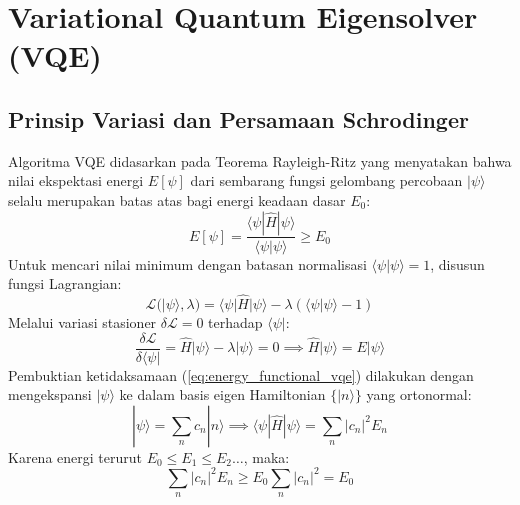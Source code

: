 \section{Variational Quantum Eigensolver (VQE)}

\subsection{Prinsip Variasi dan Persamaan Schrodinger}
Algoritma VQE didasarkan pada Teorema Rayleigh-Ritz yang menyatakan bahwa nilai ekspektasi energi $E[\psi]$ dari sembarang fungsi gelombang percobaan $|\psi\rangle$ selalu merupakan batas atas bagi energi keadaan dasar $E_0$:
\begin{equation}
E[\psi] = \frac{\langle \psi | \hat{H} | \psi \rangle}{\langle \psi | \psi \rangle} \ge E_0
\label{eq:energy_functional_vqe}
\end{equation}
Untuk mencari nilai minimum dengan batasan normalisasi $\langle \psi | \psi \rangle = 1$, disusun fungsi Lagrangian:
\begin{equation}
\mathcal{L}(|\psi\rangle, \lambda) = \langle \psi | \hat{H} | \psi \rangle - \lambda (\langle \psi | \psi \rangle - 1)
\end{equation}
Melalui variasi stasioner $\delta \mathcal{L} = 0$ terhadap $\langle \psi |$:
\begin{equation}
\frac{\delta \mathcal{L}}{\delta \langle \psi |} = \hat{H} |\psi\rangle - \lambda |\psi\rangle = 0 \implies \hat{H} |\psi\rangle = E |\psi\rangle
\end{equation}
Pembuktian ketidaksamaan (\ref{eq:energy_functional_vqe}) dilakukan dengan mengekspansi $|\psi\rangle$ ke dalam basis eigen Hamiltonian $\{|n\rangle\}$ yang ortonormal:
\begin{equation}
|\psi\rangle = \sum_n c_n |n\rangle \implies \langle \psi | \hat{H} | \psi \rangle = \sum_n |c_n|^2 E_n
\end{equation}
Karena energi terurut $E_0 \le E_1 \le E_2 \dots$, maka:
\begin{equation}
\sum_n |c_n|^2 E_n \ge E_0 \sum_n |c_n|^2 = E_0
\end{equation}

